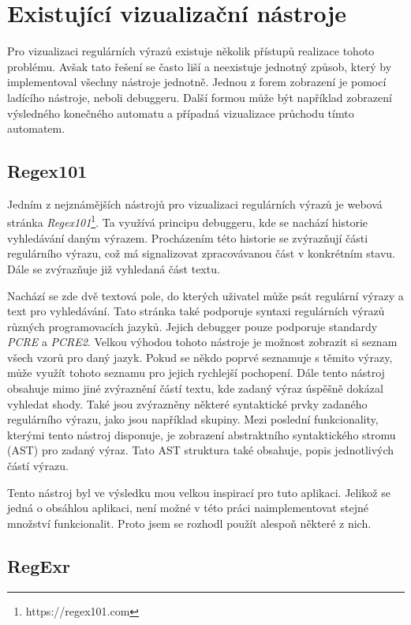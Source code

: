 \chapter{Existující vizualizační nástroje}\label{sec:ExistingApplications}

Pro vizualizaci regulárních výrazů existuje několik přístupů realizace tohoto problému.
Avšak tato řešení se často liší a neexistuje jednotný způsob, který by implementoval všechny nástroje jednotně.
Jednou z forem zobrazení je pomocí ladícího nástroje, neboli debuggeru.
Další formou může být například zobrazení výsledného konečného automatu a případná vizualizace průchodu tímto automatem.

\section{Regex101}

Jedním z nejznámějších nástrojů pro vizualizaci regulárních výrazů je webová stránka \textit{Regex101}\footnote{https://regex101.com}.
Ta využívá principu debuggeru, kde se nachází historie vyhledávání daným výrazem.
Procházením této historie se zvýrazňují části regulárního výrazu, což má signalizovat zpracovávanou část v konkrétním stavu.
Dále se zvýrazňuje již vyhledaná část textu.

Nachází se zde dvě textová pole, do kterých uživatel může psát regulární výrazy a text pro vyhledávání.
Tato stránka také podporuje syntaxi regulárních výrazů různých programovacích jazyků.
Jejich debugger pouze podporuje standardy \textit{PCRE} a \textit{PCRE2}.
Velkou výhodou tohoto nástroje je možnost zobrazit si seznam všech vzorů pro daný jazyk.
Pokud se někdo poprvé seznamuje s těmito výrazy, může využít tohoto seznamu pro jejich rychlejší pochopení.
Dále tento nástroj obsahuje mimo jiné zvýraznění částí textu, kde zadaný výraz úspěšně dokázal vyhledat shody.
Také jsou zvýrazněny některé syntaktické prvky zadaného regulárního výrazu, jako jsou například skupiny.
Mezi poslední funkcionality, kterými tento nástroj disponuje, je zobrazení abstraktního syntaktického stromu (AST) pro zadaný výraz.
Tato AST struktura také obsahuje, popis jednotlivých částí výrazu.

Tento nástroj byl ve výsledku mou velkou inspirací pro tuto aplikaci. 
Jelikož se jedná o obsáhlou aplikaci, není možné v této práci naimplementovat stejné množství funkcionalit.
Proto jsem se rozhodl použít alespoň některé z nich.

\section{RegExr}

